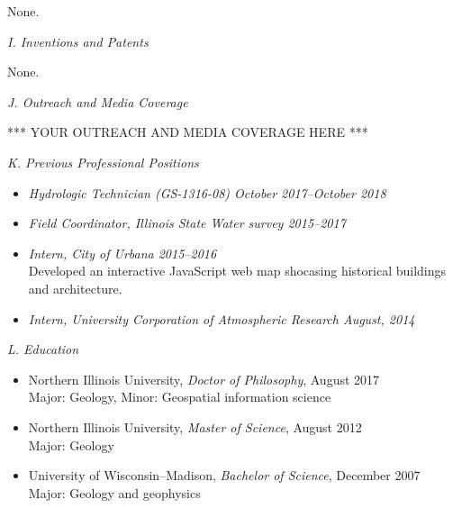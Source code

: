 \documentclass[12pt]{article}
\begin{document}
None.

\vspace{10pt}
\raggedright \large \textit{I. Inventions and Patents} \\
\normalsize
\vspace{10pt}

None.


\vspace{10pt}
\raggedright \large \textit{J. Outreach and Media Coverage} \\
\normalsize
\vspace{10pt}





*** YOUR OUTREACH AND MEDIA COVERAGE HERE ***





\vspace{10pt}
\raggedright \large \textit{K. Previous Professional Positions} \\
\normalsize
\vspace{10pt}


\begin{itemize}
\item \textit{Hydrologic Technician (GS-1316-08) \hfill October 2017--October 2018}

\item \textit{Field Coordinator, Illinois State Water survey \hfill 2015--2017}
\item \textit{Intern, City of Urbana \hfill 2015--2016} \\
  Developed an interactive JavaScript web map shocasing historical buildings and architecture.
\item \textit{Intern, University Corporation of Atmospheric Research \hfill August, 2014}
\end{itemize}


\vspace{10pt}
\raggedright \large \textit{L. Education} \\
\normalsize
\vspace{10pt}


\begin{itemize}
\item Northern Illinois University, \textit{Doctor of Philosophy}, August 2017\\
Major: Geology, Minor: Geospatial information science
\item Northern Illinois University, \textit{Master of Science}, August 2012\\
Major: Geology
\item University of Wisconsin--Madison, \textit{Bachelor of Science}, December 2007\\
Major: Geology and geophysics
\end{itemize}
\end{document}
